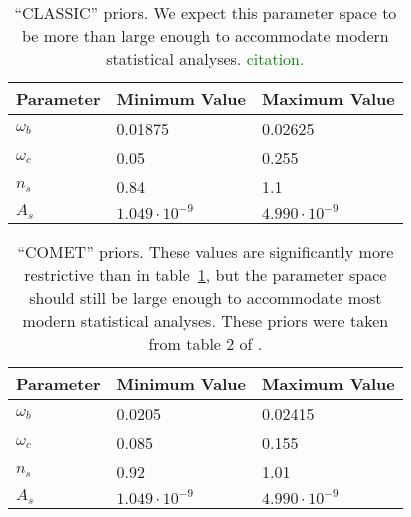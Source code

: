 \begin{comment}
\begin{table}[ht!]
\centering
\begin{tabular}{l|l|l}
\hline
Parameter & Minimum Value & Maximum Value \\ \hline
$\omega_b$ & 0.005 & 0.28 \\
$\omega_c$ & 0.001 & 0.99 \\
$n_s$ & 0.7 & 1.3 \\
$A_s$\footnotemark & $5.003 \cdot 10^{-10}$ & $1.484 \cdot 10^{-8}$  \\
\end{tabular}
 \cprotect\caption[``MEGA'' priors]{``MEGA'' priors. The range of allowed
 	values is significantly larger than the modern $3\sigma$ intervals
 	for these parameters. It was created from the most extreme values used
 	in table 1 of \citet{Mancini} and table 1 of \citet{Arico}, even including
 	CMB emulators. 
 	\textcolor{red}{Maybe since we didn't end up using this prior file, I
 	should scrap it from the discussion?}}
 \label{tab: MEGA_priors}
\end{table}
\end{comment}

\begin{table}[ht!]
\centering
\begin{tabular}{l|l|l}
\hline
Parameter & Minimum Value & Maximum Value \\ \hline
$\omega_b$ & 0.01875 & 0.02625 \\
$\omega_c$ & 0.05 & 0.255 \\
$n_s$ & 0.84 & 1.1 \\
$A_s$\footnotemark & $1.049 \cdot 10^{-9}$ & $4.990 \cdot 10^{-9}$  \\
\end{tabular}
	\cprotect\caption[``CLASSIC'' priors]{``CLASSIC'' priors. We expect this
 	parameter space to be more than large enough to accommodate modern
 	statistical analyses. \textcolor{green}{citation.}}
 \label{tab: CLASSIC_priors}
\end{table}

\begin{table}[ht!]
\centering
\begin{tabular}{l|l|l}
\hline
Parameter & Minimum Value & Maximum Value \\ \hline
$\omega_b$ & 0.0205 & 0.02415 \\
$\omega_c$ & 0.085 & 0.155 \\
$n_s$ & 0.92 & 1.01 \\
$A_s$\footnotemark & $1.049 \cdot 10^{-9}$ & $4.990 \cdot 10^{-9}$  \\
\end{tabular}
	\cprotect\caption[``COMET'' priors]{``COMET'' priors.
	These values are significantly more restrictive than in
	table~\ref{tab: CLASSIC_priors},
	but the parameter space should still be large enough to accommodate
	most modern statistical analyses.
	These priors were taken from table 2 of \citet{Eggemeier}.}
 \label{tab: COMET_priors}
\end{table}

